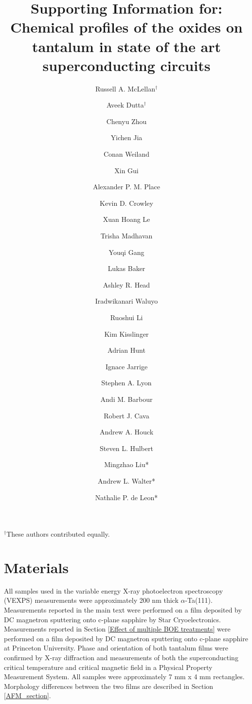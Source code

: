 \documentclass{WileyMSP-template}
\begin{document}
\pagestyle{fancy}


\title{Supporting Information for: Chemical profiles of the oxides on tantalum in state of the art superconducting circuits}

\maketitle




\author{Russell A. McLellan$^\dag{}$}
\author{Aveek Dutta$^\dag{}$}
\author{Chenyu Zhou}
\author{Yichen Jia}
\author{Conan Weiland}
\author{Xin Gui}
\author{Alexander P. M. Place}
\author{Kevin D. Crowley}
\author{Xuan Hoang Le}
\author{Trisha Madhavan}
\author{Youqi Gang}
\author{Lukas Baker}
\author{Ashley R. Head}
\author{Iradwikanari Waluyo}
\author{Ruoshui Li}
\author{Kim Kisslinger}
\author{Adrian Hunt}
\author{Ignace Jarrige}
\author{Stephen A. Lyon}
\author{Andi M. Barbour}
\author{Robert J. Cava}
\author{Andrew A. Houck}
\author{Steven L. Hulbert}
\author{Mingzhao Liu*}
\author{Andrew L. Walter*}
\author{Nathalie P. de Leon*}

$^\dag{}$These authors contributed equally.


\begin{affiliations}

\end{affiliations}

\setlength{\parindent}{20pt}

\section{Materials}

All samples used in the variable energy X-ray photoelectron spectroscopy (VEXPS) measurements were approximately 200 nm thick $\alpha$-Ta(111). Measurements reported in the main text were performed on a film deposited by DC magnetron sputtering onto c-plane sapphire by Star Cryoelectronics.  Measurements reported in Section \ref{Effect of multiple BOE treatments} were performed on a film deposited by DC magnetron sputtering onto c-plane sapphire at Princeton University. Phase and orientation of both tantalum films were confirmed by X-ray diffraction and measurements of both the superconducting critical temperature and critical magnetic field in a Physical Property Measurement System. All samples were approximately 7 mm x 4 mm rectangles. Morphology differences between the two films are described in Section \ref{AFM_section}.
\end{document}
